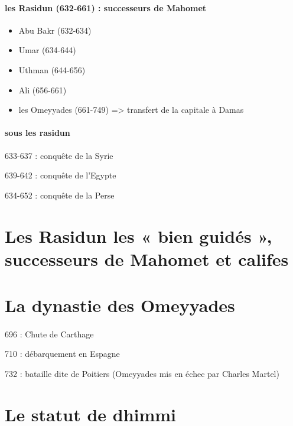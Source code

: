 \paragraph{les Rasidun (632-661) : successeurs de Mahomet}
\begin{itemize}
  \item 	Abu Bakr (632-634)
\item 	Umar (634-644)
\item 	Uthman (644-656)
\item 	Ali (656-661)
\item 	les Omeyyades (661-749) => transfert de la capitale à Damas
\end{itemize}


\paragraph{sous les rasidun}
\item 	633-637 : conquête de la Syrie
\item 	639-642 : conquête de l’Egypte
\item 	634-652 : conquête de la Perse


\section{Les Rasidun les « bien guidés », successeurs de Mahomet et califes}

 
\section{La dynastie des Omeyyades}

\paragraph{}
\item 	696 : Chute de Carthage
\item 	710 : débarquement en Espagne
\item 	732 : bataille dite de Poitiers (Omeyyades mis en échec par Charles Martel)
 
\section{Le statut de dhimmi}
